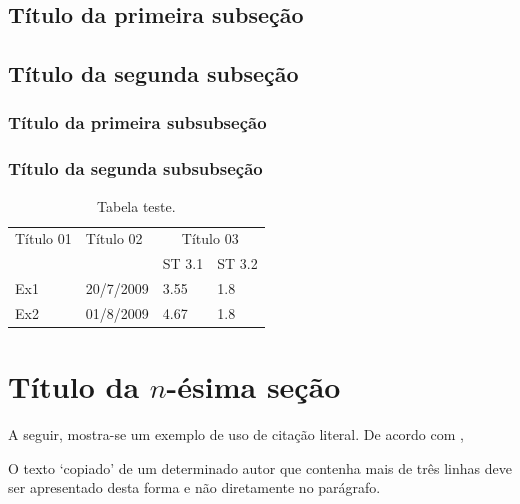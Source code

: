 \subsection{T\'itulo da primeira subse\c{c}\~ao}
\label{subsection:titulo221}

\subsection{T\'itulo da segunda subse\c{c}\~ao}
\label{subsection:titulo222}

\subsubsection{T\'itulo da primeira subsubse\c{c}\~ao}
\label{subsubsection:titulo2221}

\subsubsection{T\'itulo da segunda subsubse\c{c}\~ao}
\label{subsubsection:titulo2222}

\begin{table}
\begin{center}
\caption{Tabela teste.} \label{TabelaTeste}
\begin{tabular}{llll}
\\\hline
Título 01 & Título 02 & \multicolumn{2}{c}{Título 03} \\
 &  & ST 3.1 & ST 3.2 \\
\hline
Ex1 & 20/7/2009 & 3.55 & 1.8 \\
Ex2 & 01/8/2009 & 4.67 & 1.8 \\
\hline
\end{tabular}
\end{center}
\end{table}


\section{T\'itulo da $n$-\'esima se\c{c}\~ao}
\label{section:titulo2N}

A seguir, mostra-se um exemplo de uso de cita\c{c}\~ao literal. De
acordo com ,

\begin{CitacaoLiteral}
O texto `copiado' de um determinado autor que contenha mais de
tr\^es linhas deve ser apresentado desta forma e n\~ao diretamente
no par\'agrafo.\end{CitacaoLiteral}


